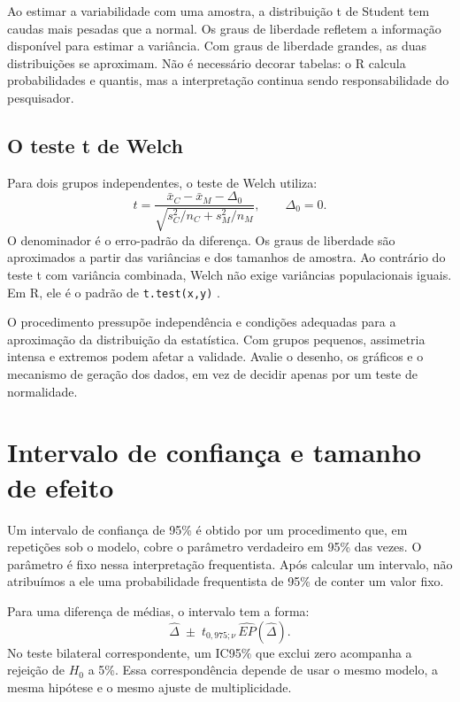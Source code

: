 Ao estimar a variabilidade com uma amostra, a distribuição t de Student tem caudas mais pesadas que a normal. Os graus de liberdade refletem a informação disponível para estimar a variância. Com graus de liberdade grandes, as duas distribuições se aproximam. Não é necessário decorar tabelas: o R calcula probabilidades e quantis, mas a interpretação continua sendo responsabilidade do pesquisador.

\subsection{O teste t de Welch}
Para dois grupos independentes, o teste de Welch utiliza:
\begin{equation}t=\frac{\bar{x}_C-\bar{x}_M-\Delta_0}
{\sqrt{s_C^2/n_C+s_M^2/n_M}},\qquad \Delta_0=0.\end{equation}
O denominador é o erro-padrão da diferença. Os graus de liberdade são aproximados a partir das variâncias e dos tamanhos de amostra. Ao contrário do teste t com variância combinada, Welch não exige variâncias populacionais iguais. Em R, ele é o padrão de \texttt{t.test(x,y)} \parencite{rwelch}.

O procedimento pressupõe independência e condições adequadas para a aproximação da distribuição da estatística. Com grupos pequenos, assimetria intensa e extremos podem afetar a validade. Avalie o desenho, os gráficos e o mecanismo de geração dos dados, em vez de decidir apenas por um teste de normalidade.

\section{Intervalo de confiança e tamanho de efeito}
Um intervalo de confiança de 95\% é obtido por um procedimento que, em repetições sob o modelo, cobre o parâmetro verdadeiro em 95\% das vezes. O parâmetro é fixo nessa interpretação frequentista. Após calcular um intervalo, não atribuímos a ele uma probabilidade frequentista de 95\% de conter um valor fixo.

Para uma diferença de médias, o intervalo tem a forma:
\begin{equation}\widehat\Delta\;\pm\;t_{0{,}975;\nu}\,
\widehat{EP}(\widehat\Delta).\end{equation}
No teste bilateral correspondente, um IC95\% que exclui zero acompanha a rejeição de $H_0$ a 5\%. Essa correspondência depende de usar o mesmo modelo, a mesma hipótese e o mesmo ajuste de multiplicidade.

